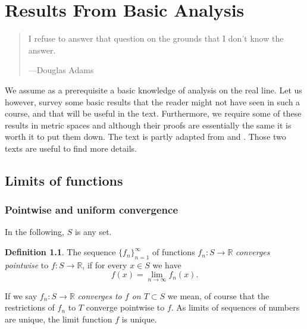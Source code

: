 \documentclass[12pt,openany]{book}
\newcommand{\R}{{\mathbb{R}}}
\newcommand{\myindex}[1]{#1\index{#1}}
\theoremstyle{plain}
\theoremstyle{remark}
\theoremstyle{definition}
\newtheorem{defn}[thm]{Definition}
\newenvironment{myquote}{%
    \begin{quote}%
    \begingroup\itshape
}{%
    \endgroup%
    \end{quote}
}
\theoremstyle{exercise}
\theoremstyle{example}
\begin{document}
\chapter{Results From Basic Analysis} \label{ap:basicanal}

\begin{myquote}
I refuse to answer that question on the grounds that I don't know the
answer.

---Douglas Adams
\end{myquote}

We assume as a prerequisite a basic knowledge of analysis on the real line.
Let us however, survey some basic results that the reader might not have
seen in such a course, and that will be useful in the text.  Furthermore,
we require some of these results in metric spaces and although their proofs
are essentially the same it is worth it to put them down.
The text is partly adapted from \cite{ra:book} and \cite{ra:book2}.
Those two texts are useful to find more details.


\section{Limits of functions}
\label{sec:puconv}

\subsection{Pointwise and uniform convergence}

In the following, $S$ is any set.

\begin{defn}
The sequence
$\{ f_n \}_{n=1}^\infty$ of functions $f_n \colon S \to \R$
\emph{\myindex{converges pointwise}} to $f \colon S \to \R$, if for every $x
\in S$
we have
\begin{equation*}
f(x) =
\lim_{n\to\infty} f_n(x) .
\end{equation*}
\end{defn}

If we say $f_n \colon S \to \R$
\emph{converges to $f$ on $T \subset S$}
we mean, of course that
the restrictions of $f_n$ to $T$ converge pointwise to $f$.
As limits of sequences of numbers are unique, the limit function $f$ is unique.
\end{document}
